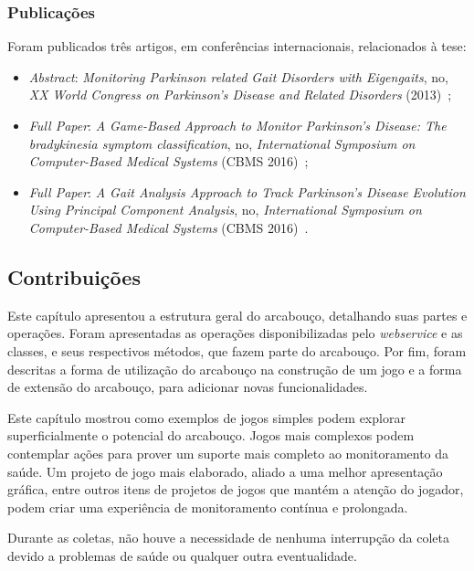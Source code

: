 \subsubsection{Publicações}
Foram publicados três artigos, em conferências internacionais, relacionados à tese: 
  \begin{itemize}
   \item \textit{Abstract}: \textit{Monitoring Parkinson related Gait Disorders with Eigengaits}, no, \textit{XX World Congress on Parkinson's Disease and Related Disorders} (2013)~\cite{lmmeigengaits2013};
   \item \textit{Full Paper}: \textit{A Game-Based Approach to Monitor Parkinson’s Disease: The bradykinesia symptom classification}, no, \textit{International Symposium on Computer-Based Medical Systems} (CBMS 2016)~\cite{lmmcbmsgame2016};
   \item \textit{Full Paper}: \textit{A Gait Analysis Approach to Track Parkinson’s Disease Evolution Using Principal Component Analysis}, no, \textit{International Symposium on Computer-Based Medical Systems} (CBMS 2016)~\cite{lmmcbmsgait2016}.
  \end{itemize}


\subsection{Contribuições}\label{sec:contribuicoes}



Este capítulo apresentou a estrutura geral do arcabouço, detalhando suas partes e operações. Foram apresentadas as operações disponibilizadas pelo \emph{webservice} e as classes, e seus respectivos métodos, que fazem parte do arcabouço. Por fim, foram descritas a forma de utilização do arcabouço na construção de um jogo e a forma de extensão do arcabouço, para adicionar novas funcionalidades.


Este capítulo mostrou como exemplos de jogos simples podem explorar superficialmente o potencial do arcabouço. Jogos mais complexos podem contemplar ações para prover um suporte mais completo ao monitoramento da saúde. Um projeto de jogo mais elaborado, aliado a uma melhor apresentação gráfica, entre outros itens de projetos de jogos que mantém a atenção do jogador, podem criar uma experiência de monitoramento contínua e prolongada.

Durante as coletas, não houve a necessidade de nenhuma interrupção da coleta devido a problemas de saúde ou qualquer outra eventualidade.


